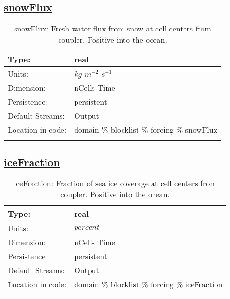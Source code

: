 \subsection[snowFlux]{\hyperref[sec:var_tab_forcing]{snowFlux}}
\label{subsec:var_sec_forcing_snowFlux}
\begin{center}
\begin{longtable}{| p{2.0in} | p{4.0in} |}
        \hline 
        Type: & real \\
        \hline 
        Units: & $kg$ $m^{-2}$ $s^{-1}$ \\
        \hline 
        Dimension: & nCells Time \\
        \hline 
        Persistence: & persistent \\
        \hline 
		 Default Streams: & Output  \\
        \hline 
		 Location in code: & domain \% blocklist \% forcing \% snowFlux \\
		 \hline 
    \caption{snowFlux: Fresh water flux from snow at cell centers from coupler. Positive into the ocean.}
\end{longtable}
\end{center}
\subsection[iceFraction]{\hyperref[sec:var_tab_forcing]{iceFraction}}
\label{subsec:var_sec_forcing_iceFraction}
\begin{center}
\begin{longtable}{| p{2.0in} | p{4.0in} |}
        \hline 
        Type: & real \\
        \hline 
        Units: & $percent$ \\
        \hline 
        Dimension: & nCells Time \\
        \hline 
        Persistence: & persistent \\
        \hline 
		 Default Streams: & Output  \\
        \hline 
		 Location in code: & domain \% blocklist \% forcing \% iceFraction \\
		 \hline 
    \caption{iceFraction: Fraction of sea ice coverage at cell centers from coupler. Positive into the ocean.}
\end{longtable}
\end{center}
